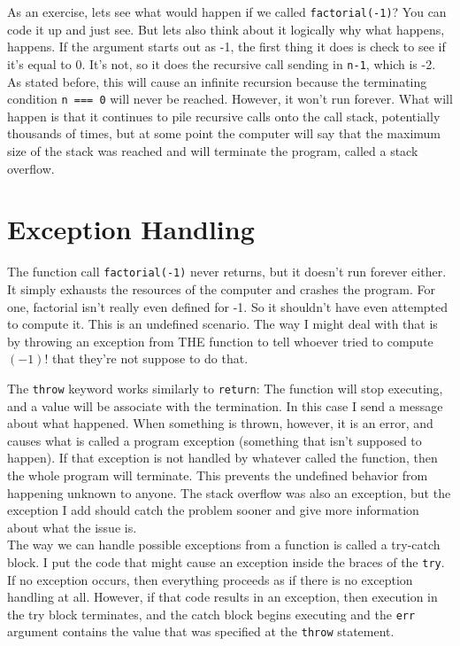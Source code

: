 As an exercise, lets see what would happen if we called \texttt{factorial(-1)}? You can code it up and just see. But lets also think about it logically why what happens, happens. If the argument starts out as -1, the first thing it does is check to see if it's equal to 0. It's not, so it does the recursive call sending in \texttt{n-1}, which is -2. As stated before, this will cause an infinite recursion because the terminating condition \texttt{n === 0} will never be reached. However, it won't run forever. What will happen is that it continues to pile recursive calls onto the call stack, potentially thousands of times, but at some point the computer will say that the maximum size of the stack was reached and will terminate the program, called a stack overflow.\\

\section{Exception Handling}


The function call \texttt{factorial(-1)} never returns, but it doesn't run forever either. It simply exhausts the resources of the computer and crashes the program. For one, factorial isn't really even defined for -1. So it shouldn't have even attempted to compute it. This is an undefined scenario. The way I might deal with that is by throwing an exception from THE function to tell whoever tried to compute \((-1)!\) that they're not suppose to do that.\\


The \texttt{throw} keyword works similarly to \texttt{return}: The function will stop executing, and a value will be associate with the termination. In this case I send a message about what happened. When something is thrown, however, it is an error, and causes what is called a program exception (something that isn't supposed to happen). If that exception is not handled by whatever called the function, then the whole program will terminate. This prevents the undefined behavior from happening unknown to anyone. The stack overflow was also an exception, but the exception I add should catch the problem sooner and give more information about what the issue is.\\

The way we can handle possible exceptions from a function is called a try-catch block. I put the code that might cause an exception inside the braces of the \texttt{try}. If no exception occurs, then everything proceeds as if there is no exception handling at all. However, if that code results in an exception, then execution in the try block terminates, and the catch block begins executing and the \texttt{err} argument contains the value that was specified at the \texttt{throw} statement.\\


